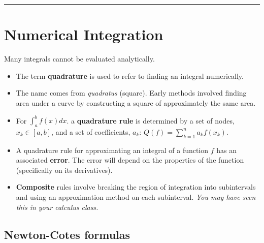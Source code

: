 \documentclass[12pt,letterpaper,noanswers]{exam}
\begin{document}
\vspace{0.2cm}
\hrule
\vspace{0.2cm}


\section*{Numerical Integration}

Many integrals cannot be evaluated analytically.

\begin{tcolorbox}
\begin{itemize}
\itemsep0em
    \item The term \textbf{quadrature} is used to refer to finding an integral numerically.
    \item The name comes from \emph{quadratus} (square).  Early methods involved finding area under a curve by constructing a square of approximately the same area.
     \item For $\displaystyle\int_a^b f(x)dx$. a \textbf{quadrature rule} is determined by a set of nodes, $x_k \in [a,b]$, and a set of coefficients, $a_k$: $\displaystyle Q(f) = \sum\limits_{k=1}^n a_k f(x_k)$. 
     \item A quadrature rule for approximating an integral of a function $f$ has an associated \textbf{error}.  The error will depend on the properties of the function (specifically on its derivatives).
    \end{itemize}
    \end{tcolorbox}
    
\begin{tcolorbox}
\begin{itemize}
\itemsep0em    
   
    
    
    \item \textbf{Composite} rules involve breaking the region of integration into subintervals and using an approximation method on each subinterval.  \emph{You may have seen this in your calculus class.}
\end{itemize}
\end{tcolorbox}

\subsection*{Newton-Cotes formulas}
\end{document}
